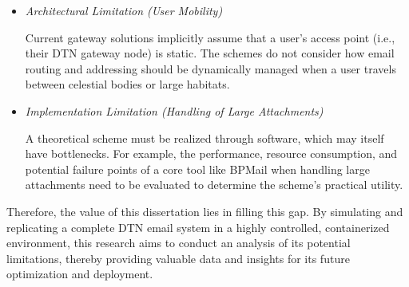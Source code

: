 \begin{itemize}
    \item \textit{Architectural Limitation (User Mobility)}
    
    Current gateway solutions implicitly assume that a user's access point (i.e., their DTN gateway node) is static. The schemes do not consider how email routing and addressing should be dynamically managed when a user travels between celestial bodies or large habitats.
    \item \textit{Implementation Limitation (Handling of Large Attachments)}
    
    A theoretical scheme must be realized through software, which may itself have bottlenecks. For example, the performance, resource consumption, and potential failure points of a core tool like BPMail when handling large attachments need to be evaluated to determine the scheme's practical utility.
\end{itemize}

Therefore, the value of this dissertation lies in filling this gap. By simulating and replicating a complete DTN email system in a highly controlled, containerized environment, this research aims to conduct an analysis of its potential limitations, thereby providing valuable data and insights for its future optimization and deployment.
